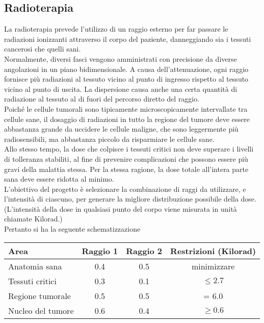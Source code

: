 \documentclass[a4paper]{extarticle}
\renewcommand\arraystretch{}
\begin{document}
\vspace{1em}
\noindent
\subsection{Radioterapia}
La radioterapia prevede l'utilizzo di un raggio esterno per far passare le radiazioni ionizzanti attraverso il corpo del paziente, danneggiando sia i tessuti cancerosi che quelli sani.\\
Normalmente, diversi fasci vengono amministrati con precisione da diverse angolazioni in un piano bidimensionale. A causa dell'attenuazione, ogni raggio fornisce più radiazioni al tessuto vicino al punto di ingresso rispetto al tessuto vicino al punto di uscita. La dispersione causa anche una certa quantità di radiazione al tessuto al di fuori del percorso diretto del raggio.\\
Poiché le cellule tumorali sono tipicamente microscopicamente intervallate tra cellule sane, il dosaggio di radiazioni in tutto la regione del tumore deve essere abbastanza grande da uccidere le cellule maligne, che sono leggermente più radiosensibili, ma abbastanza piccolo da risparmiare le cellule sane.\\
Allo stesso tempo, la dose che colpisce i tessuti critici non deve superare i livelli di tolleranza stabiliti, al fine di prevenire complicazioni che possono essere più gravi della malattia stessa. Per la stessa ragione, la dose totale all'intera parte sana deve essere ridotta al minimo.\\
L'obiettivo del progetto è selezionare la combinazione di raggi da utilizzare, e l'intensità di ciascuno, per generare la migliore distribuzione possibile della dose. (L'intensità della dose in qualsiasi punto del corpo viene misurata in unità chiamate Kilorad.)\\
Pertanto si ha la seguente schematizzazione

\begin{table}[H]
\setlength{\tabcolsep}{8pt}
\renewcommand{\arraystretch}{1.5}
\noindent
\centering
\begin{tabular}{l|c|c|c}
    Area   & Raggio 1 & Raggio 2 & Restrizioni (Kilorad)\\
    \hline
    Anatomia sana     & 0.4 & 0.5 & minimizzare\\
    Tessuti critici   & 0.3 & 0.1 & $\leq 2.7$\\
    Regione tumorale  & 0.5 & 0.5 & = 6.0\\
    Nucleo del tumore & 0.6 & 0.4 & $\geq 0.6$\\
    \hline
\end{tabular}
\end{table}
\end{document}
